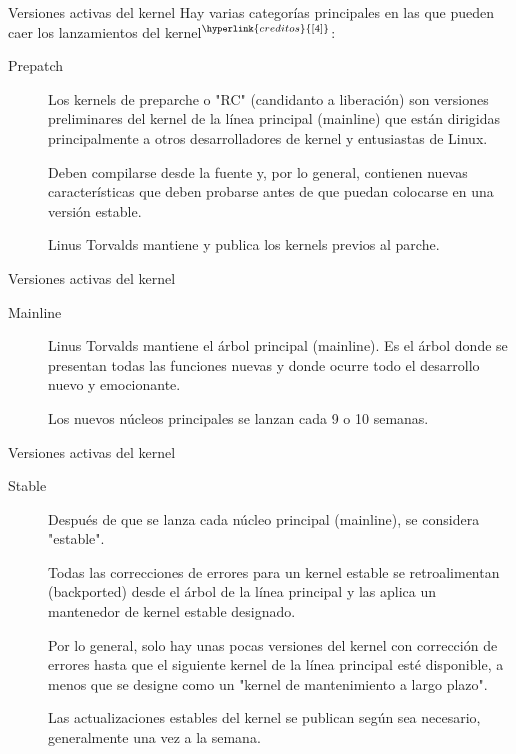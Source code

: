 \begin{frame}[c]{Versiones activas del kernel}
  Hay varias categorías principales en las que pueden caer los
  lanzamientos del kernel$^{\hyperlink{creditos}{[4]}}$:

  \vspace{\baselineskip}
  \begin{description}
    \item[Prepatch] Los kernels de preparche o "RC" (candidanto a
      liberación) son versiones preliminares del kernel de la línea principal
      (mainline) que están dirigidas principalmente a otros desarrolladores
      de kernel y entusiastas de Linux.

      \vspace{\baselineskip}
      Deben compilarse desde la fuente y, por lo general, contienen nuevas
      características que deben probarse antes de que puedan colocarse en
      una versión estable.

      \vspace{\baselineskip}
      Linus Torvalds mantiene y publica los kernels previos al parche.
  \end{description}
\end{frame}

\begin{frame}[c]{Versiones activas del kernel}
  \begin{description}
    \item[Mainline] Linus Torvalds mantiene el árbol principal (mainline).
      Es el árbol donde se presentan todas las funciones nuevas y donde
      ocurre todo el desarrollo nuevo y emocionante.

      \vspace{\baselineskip}
      Los nuevos núcleos principales se lanzan cada 9 o 10 semanas.
  \end{description}
\end{frame}

\begin{frame}[c]{Versiones activas del kernel}
  \begin{description}
    \item[Stable] Después de que se lanza cada núcleo principal (mainline),
      se considera "estable".

      \vspace{\baselineskip}
      Todas las correcciones de errores para un kernel estable se
      retroalimentan (backported) desde el árbol de la línea principal
      y las aplica un mantenedor de kernel estable designado.

      \vspace{\baselineskip}
      Por lo general, solo hay unas pocas versiones del kernel con corrección
      de errores hasta que el siguiente kernel de la línea principal esté
      disponible, a menos que se designe como un
      "kernel de mantenimiento a largo plazo".

      \vspace{\baselineskip}
      Las actualizaciones estables del kernel se publican según sea
      necesario, generalmente una vez a la semana.
  \end{description}
\end{frame}


